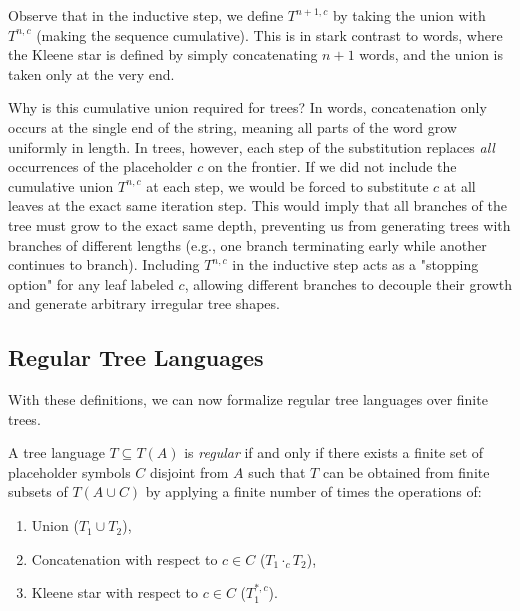 \begin{formaldetails}
Observe that in the inductive step, we define $T^{n+1, c}$ by taking the union with $T^{n, c}$ (making the sequence cumulative). This is in stark contrast to words, where the Kleene star is defined by simply concatenating $n+1$ words, and the union is taken only at the very end.

Why is this cumulative union required for trees?
In words, concatenation only occurs at the single end of the string, meaning all parts of the word grow uniformly in length. In trees, however, each step of the substitution replaces \emph{all} occurrences of the placeholder $c$ on the frontier.
If we did not include the cumulative union $T^{n, c}$ at each step, we would be forced to substitute $c$ at all leaves at the exact same iteration step. This would imply that all branches of the tree must grow to the exact same depth, preventing us from generating trees with branches of different lengths (e.g., one branch terminating early while another continues to branch). Including $T^{n, c}$ in the inductive step acts as a "stopping option" for any leaf labeled $c$, allowing different branches to decouple their growth and generate arbitrary irregular tree shapes.
\end{formaldetails}

\subsection{Regular Tree Languages}
With these definitions, we can now formalize regular tree languages over finite trees.

\begin{definition}
A tree language $T \subseteq T(A)$ is \emph{regular} if and only if there exists a finite set of placeholder symbols $C$ disjoint from $A$ such that $T$ can be obtained from finite subsets of $T(A \cup C)$ by applying a finite number of times the operations of:
\begin{enumerate}
    \item Union ($T_1 \cup T_2$),
    \item Concatenation with respect to $c \in C$ ($T_1 \cdot_c T_2$),
    \item Kleene star with respect to $c \in C$ ($T_1^{*, c}$).
\end{enumerate}
\end{definition}


